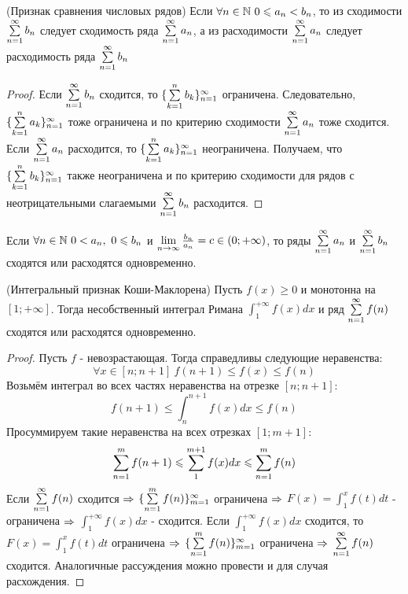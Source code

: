 \begin{theorem} (Признак сравнения числовых рядов)
	Если $\forall n \in \mathbb{N}\ 0 \leqslant a_n < b_n$, то из сходимости $\sum\limits_{n = 1}^\infty b_n$ следует сходимость ряда $\sum\limits_{n = 1}^{\infty} a_n$, а из расходимости $\sum\limits_{n = 1}^\infty a_n$ следует расходимость ряда $\sum\limits_{n = 1}^\infty b_n$
\end{theorem}

\begin{proof}
	Если $\sum\limits_{n = 1}^\infty b_n$ сходится, то $\{\sum\limits_{k = 1}^n b_k\}_{n = 1}^\infty$ ограничена. Следовательно, $\{\sum\limits_{k = 1}^n a_k\}_{n = 1}^\infty$ тоже ограничена и по критерию сходимости $\sum\limits_{n = 1}^\infty a_n$ тоже сходится.
	Если $\sum\limits_{n = 1}^\infty a_n$ расходится, то $\{\sum\limits_{k = 1}^n a_k\}_{n = 1}^\infty$ неограничена. Получаем, что $\{\sum\limits_{k = 1}^n b_k\}_{n = 1}^\infty$ также неограничена и по критерию сходимости для рядов с неотрицательными слагаемыми $\sum\limits_{n = 1}^\infty b_n$  расходится.
\end{proof}

\begin{corollary}
	Если $\forall n \in \mathbb{N}\ 0 < a_n,\ 0 \leqslant b_n$ и $\lim\limits_{n \to \infty} \frac{b_n}{a_n} = c \in (0; +\infty)$, то ряды $\sum\limits_{n = 1}^\infty a_n$ и $\sum\limits_{n = 1}^\infty b_n$ сходятся или расходятся одновременно.
\end{corollary}

\begin{theorem} (Интегральный признак Коши-Маклорена)
	Пусть $f(x) \ge 0$ и монотонна на $[1; +\infty]$. Тогда несобственный интеграл Римана $\int_1^{+\infty} f(x) dx$ и ряд $\sum\limits_{n = 1}^\infty f(n)$ сходятся или расходятся одновременно.
\end{theorem}

\begin{proof}
	Пусть $f$ - невозрастающая. Тогда справедливы следующие неравенства:
	\[
		\forall x \in [n; n + 1]\ f(n + 1) \le f(x) \le f(n)
	\]
	Возьмём интеграл во всех частях неравенства на отрезке $[n; n + 1]$:
	\[
		f(n + 1) \le \int_n^{n + 1} f(x) dx \le f(n)
	\]
	Просуммируем такие неравенства на всех отрезках $[1; m + 1]$:
	\[
		\sum\limits_{n = 1}^m f(n + 1) \leqslant \sum\limits_1^{m + 1} f(x) dx \leqslant \sum\limits_{n = 1}^m f(n)
	\]
	Если $\sum\limits_{n = 1}^\infty f(n)$ сходится $\Rightarrow$ $\{\sum\limits_{n = 1}^m f(n)\}_{m = 1}^\infty$ ограничена $\Rightarrow$ $F(x) = \int_1^x f(t) dt$ - ограничена $\Rightarrow$ $\int_1^{+\infty} f(x) dx$ - сходится.
	Если $\int_1^{+\infty} f(x)dx$ сходится, то $F(x) = \int_1^x f(t)dt$ ограничена $\Rightarrow$ $\{\sum\limits_{n = 1}^m f(n)\}_{m = 1}^\infty$  ограничена  $\Rightarrow$ $\sum\limits_{n = 1}^\infty f(n)$ сходится. Аналогичные рассуждения можно провести и для случая расхождения.
\end{proof}

